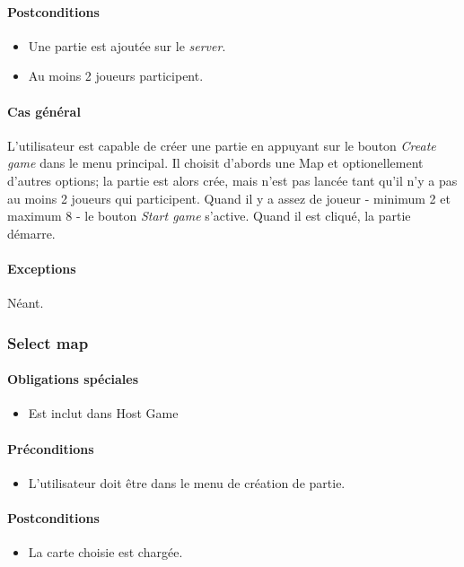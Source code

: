 \documentclass[a4paper,11pt]{report}
\begin{document}
\paragraph{Postconditions}
\begin{itemize}
 \item Une partie est ajoutée sur le \textit{server}.
 \item Au moins 2 joueurs participent.
\end{itemize}
\paragraph{Cas général}
L'utilisateur est capable de créer une partie en appuyant sur le bouton \og \textit{Create game} \fg dans le menu principal.
Il choisit d'abords une Map et optionellement d'autres options; la partie est alors crée, mais n'est pas lancée tant qu'il n'y a pas au moins 2 joueurs qui participent.
Quand il y a assez de joueur - minimum 2 et maximum 8 - le bouton \og \textit{Start game} \fg s'active. Quand il est cliqué, la partie démarre.
\paragraph{Exceptions} Néant.

\newpage
\subsubsection{Select map}
\paragraph{Obligations spéciales}
\begin{itemize}
 \item Est inclut dans Host Game
\end{itemize}
\paragraph{Préconditions}
\begin{itemize}
 \item L'utilisateur doit être dans le menu de création de partie.
\end{itemize}
\paragraph{Postconditions}
\begin{itemize}
 \item La carte choisie est chargée.
\end{itemize}
\end{document}
